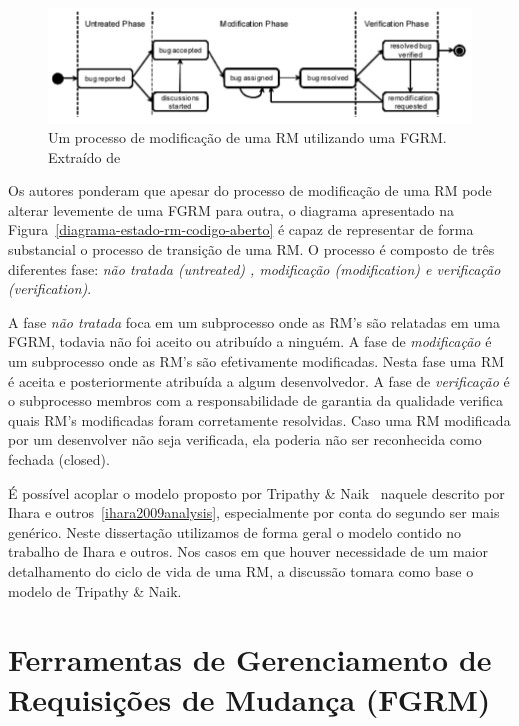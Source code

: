 \begin{figure}[htpb]
	\centering
	\includegraphics[width=0.8\linewidth]{./chapter-manutencao-software-visao-geral/img/diagrama-estado-rm-codigo-aberto.pdf}
	\caption{Um processo de modificação de uma RM utilizando uma FGRM. Extraído
	de~\cite{ihara2009analysis}}
	\label{fig:diagrama-estado-rm-codigo-aberto}
\end{figure}

Os autores ponderam que apesar do processo de modificação de uma RM pode alterar
levemente de uma FGRM para outra, o diagrama apresentado na
Figura~\ref{diagrama-estado-rm-codigo-aberto} é capaz de representar de forma
substancial o processo de transição de uma RM. O processo é composto de três
diferentes fase: \textit{não tratada (untreated) , modificação (modification) e
verificação (verification)}.

A fase \textit{não tratada} foca em um subprocesso onde as RM's são relatadas em
uma FGRM, todavia não foi aceito ou atribuído a ninguém. A fase de
\textit{modificação} é um subprocesso onde as RM's são efetivamente modificadas.
Nesta fase uma RM é aceita e posteriormente atribuída a algum desenvolvedor.  A
fase de \textit{verificação} é o subprocesso membros com a responsabilidade de
garantia da qualidade verifica quais RM's modificadas foram corretamente
resolvidas. Caso uma RM modificada por um desenvolver não seja verificada, ela
poderia não ser reconhecida como fechada (closed).

É possível acoplar o modelo proposto por Tripathy \&
Naik~\cite{tripathy2014software} naquele descrito por Ihara e
outros~\ref{ihara2009analysis}, especialmente por conta do segundo ser mais
genérico.  Neste dissertação utilizamos de forma geral o modelo contido no
trabalho de Ihara e outros. Nos casos em que houver necessidade de um maior
detalhamento do ciclo de vida de uma RM, a discussão tomara como base o modelo
de Tripathy \& Naik.
\todoend

\section{Ferramentas de Gerenciamento de Requisições de Mudança (FGRM)}
\label{sec:ferramentas_de_gerenciamento_requisicoes_de_mudanca}

